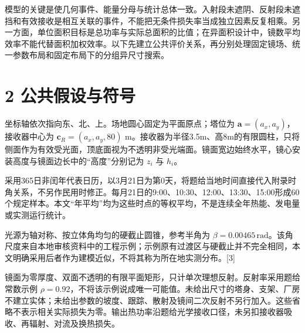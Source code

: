 \documentclass[UTF8,fontset=windows,zihao=-4]{ctexart}
\begin{document}
模型的关键是使几何事件、能量分母与统计总体一致。入射段未遮阴、反射段未遮挡和有效接收是相互关联的事件，不能把无条件损失率当成独立因素反复相乘。另一方面，单位面积目标是总功率与实际总面积的比值；在异面积设计中，镜数平均效率不能代替面积加权效率。以下先建立公共评价关系，再分别处理固定镜场、统一参数布局和固定布局下的分组异尺寸搜索。

\section*{2 公共假设与符号}

坐标轴依次指向东、北、上。场地圆心固定为平面原点；塔位为 \(\boldsymbol a=(a_x,a_y)\)，接收器中心为 \(\boldsymbol c_R=(a_x,a_y,80)\) m。接收器为半径3.5m、高8m的有限圆柱，只将侧面作为有效受光面，顶底面视为不透明非受光端面。镜面宽边始终水平，镜心安装高度与镜面边长中的“高度”分别记为 \(z_i\) 与 \(h_i\)。

采用365日非闰年代表日历，以3月21日为第0天，将题给当地时间直接代入附录时角关系，不另作民用时修正。每月21日的9:00、10:30、12:00、13:30、15:00形成60个规定样本。本文“年平均”均为这些时点的等权平均，不是连续全年热能、发电量或实测运行统计。

光源为轴对称、按立体角均匀的硬截止圆锥，参考半角为 \(\beta=0.00465\,\mathrm{rad}\)。该角尺度来自本地审核资料中的工程示例；示例原有过渡区与硬截止并不完全相同，本文明确采用后者作为建模近似，不将其称为所在地实测分布。[3]

镜面为零厚度、双面不透明的有限平面矩形，只计单次理想反射。反射率采用题给常数示例 \(\rho=0.92\)，不将该示例说成唯一可能值。未给出尺寸的塔身、支架、厂房不建立实体；未给出参数的坡度、跟踪、散射及镜间二次反射不另行加入。这些省略不表示相关实际损失为零。输出热功率沿题给光学接收口径，未另扣接收器吸收、再辐射、对流及换热损失。
\end{document}
